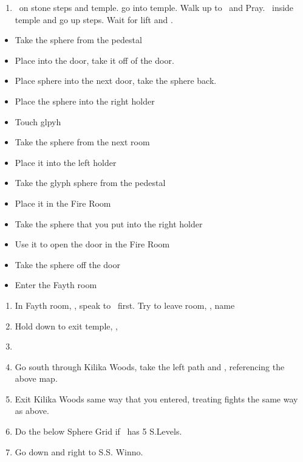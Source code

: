 \begin{enumerate}[resume]
    \item \sd\ on stone steps and temple. go into temple. Walk up to \wakka\ and Pray. \sd\ inside temple and go up steps. Wait for lift and \sd.
\end{enumerate}
\begin{trial}
    \begin{itemize}
        \item Take the sphere from the pedestal
        \item Place into the door, take it off of the door.
        \item Place sphere into the next door, take the sphere back.
        \item Place the sphere into the right holder
        \item Touch glpyh
        \item Take the sphere from the next room
        \item Place it into the left holder
        \item Take the glyph sphere from the pedestal
        \item Place it in the Fire Room
        \item Take the sphere that you put into the right holder
        \item Use it to open the door in the Fire Room
        \item Take the sphere off the door
        \item Enter the Fayth room
    \end{itemize}
\end{trial}
\begin{enumerate}[resume]
    \item In Fayth room, \sd, speak to \wakka\ first. Try to leave room, \sd, name \ifrit
    \item Hold down to exit temple, \cs[0:40], \sd
    \item \formation{\tidus}{\wakka}{\lulu}
    \item Go south through Kilika Woods, take the left path and , referencing the above map.
    \item Exit Kilika Woods same way that you entered, treating fights the same way as above.
    \item Do the below Sphere Grid if \tidus\ has 5 S.Levels.
    \item Go down and right to S.S. Winno. \sd
\end{enumerate}
